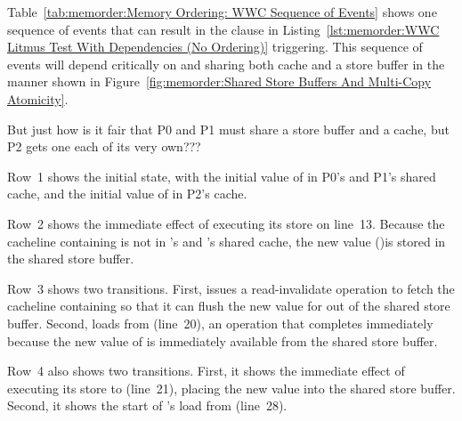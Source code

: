Table~\ref{tab:memorder:Memory Ordering: WWC Sequence of Events}
shows one sequence of events that can result in the  clause in
Listing~\ref{lst:memorder:WWC Litmus Test With Dependencies (No Ordering)}
triggering.
This sequence of events will depend critically on  and
 sharing both cache and a store buffer in the manner shown in
Figure~\ref{fig:memorder:Shared Store Buffers And Multi-Copy Atomicity}.

\QuickQuiz{}
	But just how is it fair that P0 and P1 must share a store buffer
	and a cache, but P2 gets one each of its very own???
 \QuickQuizEnd

Row~1 shows the initial state, with the initial value of  in
P0's and P1's shared cache, and the initial value of  in
P2's cache.

Row~2 shows the immediate effect of  executing its store on line~13.
Because the cacheline containing  is not in 's and 's
shared cache, the new value ()is stored in the shared store buffer.

Row~3 shows two transitions.
First,  issues a read-invalidate operation to fetch the cacheline
containing  so that it can flush the new value for  out of
the shared store buffer.
Second,  loads from  (line~20), an operation that completes
immediately because the new value of  is immediately available
from the shared store buffer.

Row~4 also shows two transitions.
First, it shows the immediate effect of  executing its store to
 (line~21), placing the new value into the shared store buffer.
Second, it shows the start of 's load from  (line~28).

